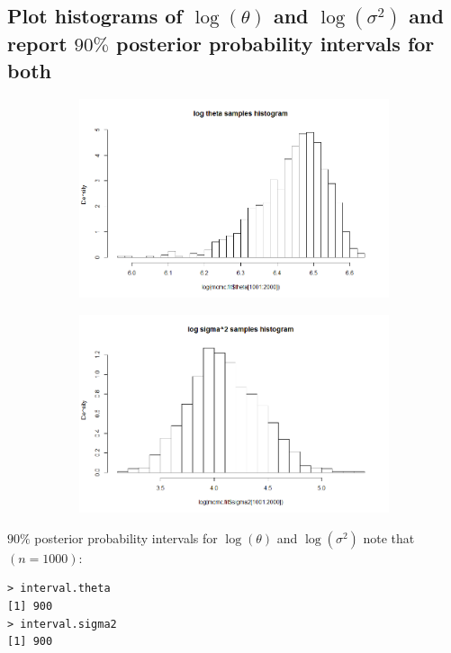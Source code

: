 \documentclass[20pt]{article} %
\begin{document}
\subsection{Plot histograms of $\log(\theta)$ and $\log(\sigma^{2})$ and report $90\%$ posterior probability intervals for both}
\begin{figure}[!htbp]
  	\centering
   	\begin{subfigure}[p]{0.7\linewidth}
    	\includegraphics[width=\linewidth]{../figures/midterm2.png}
   	\end{subfigure}
\end{figure} 
\begin{figure}[!htbp]
  	\centering
   	\begin{subfigure}[p]{0.7\linewidth}
    	\includegraphics[width=\linewidth]{../figures/midterm3.png}
   	\end{subfigure}
\end{figure} 

$90\%$ posterior probability intervals for $\log(\theta)$ and $\log(\sigma^{2})$ note that $(n = 1000)$:
\begin{verbatim}
> interval.theta
[1] 900
> interval.sigma2
[1] 900
\end{verbatim}
\end{document}
